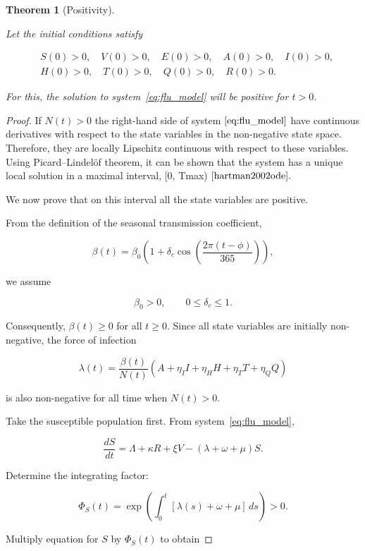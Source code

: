 \documentclass[12pt,a4paper]{article}
\newtheorem{theorem}{Theorem}[section]
\theoremstyle{definition}
\theoremstyle{remark}
\begin{document}
\begin{theorem}[Positivity]
\label{thm:influenza_positivity}

Let the initial conditions satisfy

\[
\begin{aligned}
&S(0)>0,\quad V(0)>0,\quad E(0)>0,\quad A(0)>0,\quad I(0)>0,\\
&H(0)>0,\quad T(0)>0,\quad Q(0)>0,\quad R(0)>0.
\end{aligned}
\]

For this, the solution to system~\eqref{eq:flu_model} will be positive for $t>0$.

\end{theorem}

\begin{proof}


If $N(t)>0$ the right-hand side of system$~\eqref{eq:flu_model}$ have continuous derivatives with respect to the state variables in the non-negative state space. Therefore, they are locally Lipschitz continuous with respect to these variables. Using Picard–Lindelöf theorem, it can be shown that the system has a unique local solution in a maximal interval, [0, Tmax) $\cite{hartman2002ode}.$



We now prove that on this interval all the state variables are positive.

From the definition of the seasonal transmission coefficient,

$$
\beta(t)=\beta_0\left(1+\delta_c\cos\left(\frac{2\pi(t-\phi)}{365}\right)\right),
$$

we assume

$$
\beta_0>0,\qquad 0\leq\delta_c\leq1.
$$

Consequently, $\beta(t)\geq0$ for all $t\geq0$. Since all state variables are initially non-negative, the force of infection

$$
\lambda(t)=\frac{\beta(t)}{N(t)}
\left(A+\eta_I I+\eta_H H+\eta_T T+\eta_Q Q\right)
$$

is also non-negative for all time when $N(t)>0$.

Take the susceptible population first. From system~\eqref{eq:flu_model},

$$
\frac{dS}{dt}
=
\Lambda+\kappa R+\xi V-(\lambda+\omega+\mu)S.
$$

Determine the integrating factor:

$$
\Phi_S(t)
=
\exp\left(
\int_0^t[\lambda(s)+\omega+\mu]\,ds
\right)>0.
$$

Multiply equation for $S$ by $\Phi_S(t)$ to obtain


\end{proof}
\end{document}
